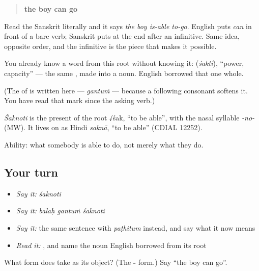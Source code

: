 \begin{quote}
\textbf{the boy can go}
\end{quote}

Read the Sanskrit literally and it says \emph{the boy is-able to-go}. English puts \emph{can} in front of a bare verb; Sanskrit puts \textbf{} at the end after an infinitive. Same idea, opposite order, and the infinitive is the piece that makes it possible.

You already know a word from this root without knowing it: \textbf{} (\emph{śakti}), \textquotedblleft{}power, capacity\textquotedblright{} — the same \textbf{}, made into a noun. English borrowed that one whole.

(The \textbf{} of \textbf{} is written \textbf{} here — \emph{gantuṁ} — because a following consonant softens it. You have read that mark since the asking verb.)

\begin{cousinweb}
\emph{Śaknoti} is the present of the root √śak, \textquotedblleft{}to be able\textquotedblright{}, with the nasal syllable \emph{-no-} (MW). It lives on as Hindi \emph{saknā}, \textquotedblleft{}to be able\textquotedblright{} (CDIAL 12252).
\end{cousinweb}

\begin{grammarlens}[title={What you've built}]
Ability: what somebody is able to do, not merely what they do.
\end{grammarlens}

\subsection*{Your turn}
\begin{itemize}
\raggedright
  \item \emph{Say it:} \emph{śaknoti}
  \item \emph{Say it:} \emph{bālaḥ gantuṁ śaknoti}
  \item \emph{Say it:} the same sentence with \emph{paṭhitum} instead, and say what it now means
  \item \emph{Read it:} \textbf{}, and name the noun English borrowed from its root
\end{itemize}

\begin{tcolorbox}[breakable,colback=teal!4,colframe=teal!35!black,title={Before you move on}]
What form does \textbf{} take as its object? (The \textbf{-} form.) Say \textquotedblleft{}the boy can go\textquotedblright{}.
\end{tcolorbox}
